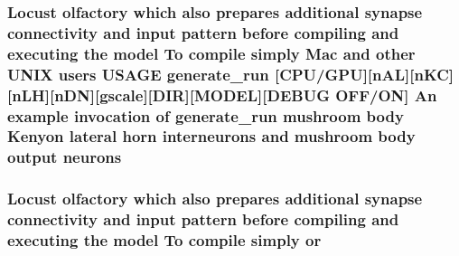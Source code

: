 \hypertarget{userproject_2MBody1__project_2README_8txt_a944a3d5062fd6de3a08a55d511a2fa8a}{
\subsubsection[{neurons}]{\setlength{\rightskip}{0pt plus 5cm}Locust olfactory which also prepares additional synapse connectivity and input pattern before compiling and executing the {\bf model} To compile simply Mac and other U\+N\+I\+X users U\+S\+A\+G\+E {\bf generate\+\_\+run} \mbox{[}{\bf C\+P\+U}/{\bf G\+P\+U}\mbox{]}\mbox{[}n\+A\+L\mbox{]}\mbox{[}n\+K\+C\mbox{]}\mbox{[}n\+L\+H\mbox{]}\mbox{[}n\+D\+N\mbox{]}\mbox{[}gscale\mbox{]}\mbox{[}D\+I\+R\mbox{]}\mbox{[}M\+O\+D\+E\+L\mbox{]}\mbox{[}D\+E\+B\+U\+G O\+F\+F/O\+N\mbox{]} An example invocation of {\bf generate\+\_\+run} mushroom body Kenyon lateral horn {\bf interneurons} and mushroom body output neurons}}\label{userproject_2MBody1__project_2README_8txt_a944a3d5062fd6de3a08a55d511a2fa8a}
\hypertarget{userproject_2MBody1__project_2README_8txt_abe668cd749436216a416616a79152d9d}{
\subsubsection[{or}]{\setlength{\rightskip}{0pt plus 5cm}Locust olfactory which also prepares additional synapse connectivity and input pattern before compiling and executing the {\bf model} To compile simply or}}\label{userproject_2MBody1__project_2README_8txt_abe668cd749436216a416616a79152d9d}
